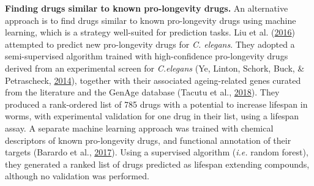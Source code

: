 \documentclass[12pt,twoside]{unicam}
\begin{document}
\textbf{Finding drugs similar to known pro-longevity drugs.} An alternative approach is to find drugs similar to known pro-longevity drugs using machine learning, which is a strategy well-suited for prediction tasks. Liu et al. (\protect\hyperlink{ref-Liu2016}{2016}) attempted to predict new pro-longevity drugs for \emph{C. elegans}. They adopted a semi-supervised algorithm trained with high-confidence pro-longevity drugs derived from an experimental screen for \emph{C.elegans} (Ye, Linton, Schork, Buck, \& Petrascheck, \protect\hyperlink{ref-Ye2014}{2014}), together with their associated ageing-related genes curated from the literature and the GenAge database (Tacutu et al., \protect\hyperlink{ref-Tacutu2018}{2018}). They produced a rank-ordered list of 785 drugs with a potential to increase lifespan in worms, with experimental validation for one drug in their list, using a lifespan assay. A separate machine learning approach was trained with chemical descriptors of known pro-longevity drugs, and functional annotation of their targets (Barardo et al., \protect\hyperlink{ref-Barardo2017}{2017}). Using a supervised algorithm (\emph{i.e.} random forest), they generated a ranked list of drugs predicted as lifespan extending compounds, although no validation was performed.
\end{document}
